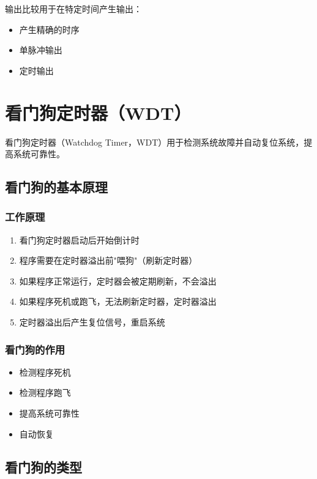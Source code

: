 输出比较用于在特定时间产生输出：
\begin{itemize}
  \item 产生精确的时序
  \item 单脉冲输出
  \item 定时输出
\end{itemize}

\section{看门狗定时器（WDT）}

看门狗定时器（Watchdog Timer，WDT）用于检测系统故障并自动复位系统，提高系统可靠性。

\subsection{看门狗的基本原理}

\subsubsection{工作原理}

\begin{enumerate}
  \item 看门狗定时器启动后开始倒计时
  \item 程序需要在定时器溢出前"喂狗"（刷新定时器）
  \item 如果程序正常运行，定时器会被定期刷新，不会溢出
  \item 如果程序死机或跑飞，无法刷新定时器，定时器溢出
  \item 定时器溢出后产生复位信号，重启系统
\end{enumerate}

\subsubsection{看门狗的作用}

\begin{itemize}
  \item 检测程序死机
  \item 检测程序跑飞
  \item 提高系统可靠性
  \item 自动恢复
\end{itemize}

\subsection{看门狗的类型}

